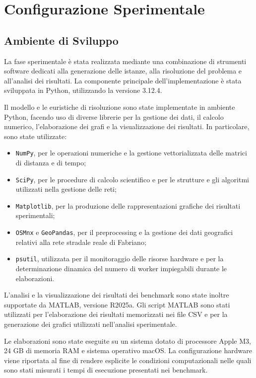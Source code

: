 \section{Configurazione Sperimentale}\label{se:configurazione}



\subsection{Ambiente di Sviluppo}


La fase sperimentale è stata realizzata mediante una combinazione di strumenti software dedicati alla generazione delle istanze, alla risoluzione del problema e all'analisi dei risultati. La componente principale dell'implementazione è stata sviluppata in Python, utilizzando la versione 3.12.4.

Il modello e le euristiche di risoluzione sono state implementate in ambiente Python, facendo uso di diverse librerie per la gestione dei dati, il calcolo numerico, l'elaborazione dei grafi e la visualizzazione dei risultati. In particolare, sono state utilizzate:

\begin{itemize}
	\item \texttt{NumPy}, per le operazioni numeriche e la gestione vettorializzata delle matrici di distanza e di tempo;
	\item \texttt{SciPy}, per le procedure di calcolo scientifico e per le strutture e gli algoritmi utilizzati nella gestione delle reti;
	\item \texttt{Matplotlib}, per la produzione delle rappresentazioni grafiche dei risultati sperimentali;
	\item \texttt{OSMnx} e \texttt{GeoPandas}, per il preprocessing e la gestione dei dati geografici relativi alla rete stradale reale di Fabriano;
	\item \texttt{psutil}, utilizzata per il monitoraggio delle risorse hardware e per la determinazione dinamica del numero di worker impiegabili durante le elaborazioni.
\end{itemize}

L'analisi e la visualizzazione dei risultati dei benchmark sono state inoltre supportate da MATLAB, versione R2025a. Gli script MATLAB sono stati utilizzati per l'elaborazione dei risultati memorizzati nei file CSV e per la generazione dei grafici utilizzati nell'analisi sperimentale.

Le elaborazioni sono state eseguite su un sistema dotato di processore Apple M3, 24 GB di memoria RAM e sistema operativo macOS. La configurazione hardware viene riportata al fine di rendere esplicite le condizioni computazionali nelle quali sono stati misurati i tempi di esecuzione presentati nei benchmark.


